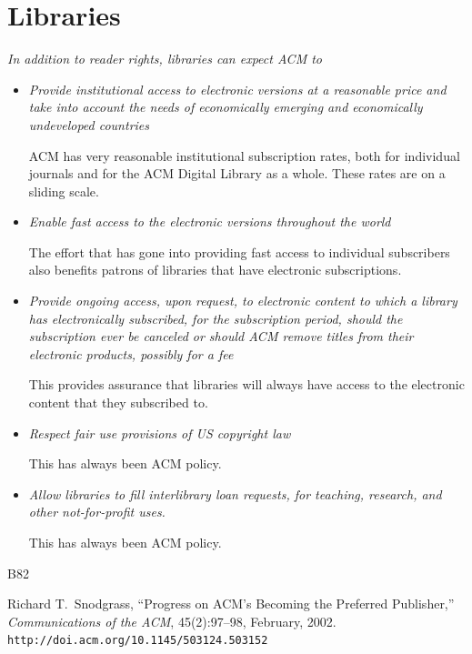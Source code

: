 \documentclass{article}
\begin{document}
\section{Libraries}

{\em In addition to reader rights, libraries can expect ACM to}

\begin{itemize}
\item {\em Provide institutional access to electronic versions at a
  reasonable price and take into account the needs of economically emerging
  and economically undeveloped countries}

  ACM has very reasonable institutional subscription rates, both for
  individual journals and for the ACM Digital Library as a whole. These
  rates are on a sliding scale.

\item {\em Enable fast access to the electronic versions throughout the
  world}

  The effort that has gone into providing fast access to individual
  subscribers also benefits patrons of libraries that have electronic subscriptions.

\item {\em Provide ongoing access, upon request, to electronic content to
  which a library has electronically subscribed, for the subscription
  period, should the subscription ever be canceled or should ACM remove
  titles from their electronic products, possibly for a fee}

  This provides assurance that libraries will always have access to the
  electronic content that they subscribed to.

\item {\em Respect fair use provisions of US copyright law}

  This has always been ACM policy.

\item {\em Allow libraries to fill interlibrary loan requests, for teaching,
  research, and other not-for-profit uses.}

  This has always been ACM policy.
\end{itemize}

\vspace*{-1ex}

\begin{thebibliography}{B82}

Richard T.~Snodgrass, ``Progress on ACM's Becoming the Preferred Publisher,''
{\em Communications of the ACM}, 45(2):97--98, February, 2002.
{\tt http://doi.acm.org/10.1145/503124.503152}
\end{thebibliography}
\end{document}
